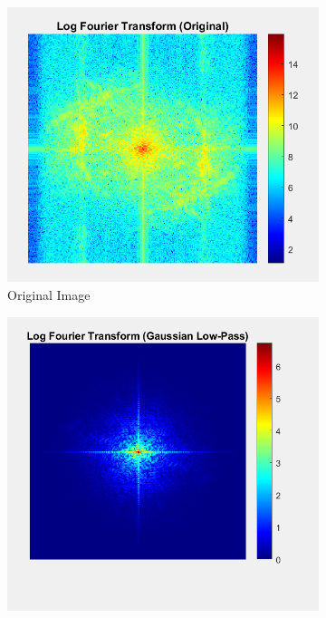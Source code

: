\documentclass[a4paper]{article}
\begin{document}
\begin{figure}[h]
    \centering
    \begin{subfigure}{0.33\linewidth}
        \centering
        \includegraphics[width=\linewidth]{fo_ori.png}
        \caption{Original Image}
    \end{subfigure}
    \begin{subfigure}{0.33\linewidth}
        \centering
        \includegraphics[width=\linewidth]{40_image_fo.png}

\end{subfigure}
\end{figure}
\end{document}
